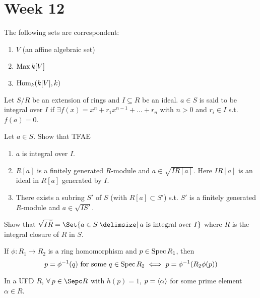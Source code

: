 
\section{Week 12}

\begin{exercise}
  The following sets are correspondent:
  \begin{enumerate}[(1)]
    \item $V$ (an affine algebraic set)
    \item $\operatorname{Max} k[V]$
    \item $\operatorname{Hom}_k(k[V], k)$
  \end{enumerate}
\end{exercise}

\begin{definition}
  Let $S/R$ be an extension of rings and $I \subseteq R$ be an ideal.
  $a \in S$ is said to be integral over $I$ if $\exists f(x) = x^n + r_1x^{n-1}
  + \dots + r_n$ with $n > 0$ and $r_i \in I$ s.t. $f(a) = 0$.
\end{definition}

\begin{exercise}
  Let $a \in S$. Show that TFAE
  \begin{enumerate}[(1)]
    \item $a$ is integral over $I$.
    \item $R[a]$ is a finitely generated $R$-module and $a \in \sqrt{IR[a]}$.
      Here $IR[a]$ is an ideal in $R[a]$ generated by $I$.
    \item There exists a subring $S'$ of $S$ (with $R[a] \subset S'$)
      s.t. $S'$ is a finitely generated $R$-module and $a \in \sqrt{IS'}$.
  \end{enumerate}
\end{exercise}

\begin{exercise}
  Show that $\sqrt{I\bar{R}} = \Set{a \in S \given a \text{~is integral over~} I}$
  where $\bar{R}$ is the integral closure of $R$ in $S$.
\end{exercise}

\begin{exercise}
  If $\phi: R_1 \to R_2$ is a ring homomorphism and $p \in \operatorname{Spec} R_1$, then
  \[
    p = \phi^{-1}(q) \text{ for some } q \in \operatorname{Spec} R_2
    \iff p = \phi^{-1}(R_2 \phi(p))
  \]
\end{exercise}

\begin{exercise}
  In a UFD $R$, $\forall p \in \Sepc R$ with $h(p) = 1$, $p = \langle\alpha\rangle$ for
  some prime element $\alpha \in R$.
\end{exercise}
